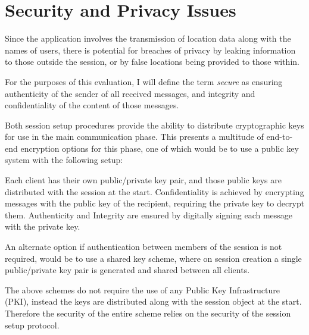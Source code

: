 \section{Security and Privacy Issues}
\label{security}

Since the application involves the transmission of location data along with the names of users, there is potential for breaches of privacy by leaking information to those outside the session, or by false locations being provided to those within.

For the purposes of this evaluation, I will define the term \emph{secure} as ensuring authenticity of the sender of all received messages, and integrity and confidentiality of the content of those messages.

Both session setup procedures provide the ability to distribute cryptographic keys for use in the main communication phase. This presents a multitude of end-to-end encryption options for this phase, one of which would be to use a public key system with the following setup:

Each client has their own public/private key pair, and those public keys are distributed with the session at the start. Confidentiality is achieved by encrypting messages with the public key of the recipient, requiring the private key to decrypt them. Authenticity and Integrity are ensured by digitally signing each message with the private key.

An alternate option if authentication between members of the session is not required, would be to use a shared key scheme, where on session creation a single public/private key pair is generated and shared between all clients.

The above schemes do not require the use of any Public Key Infrastructure (PKI), instead the keys are distributed along with the session object at the start. Therefore the security of the entire scheme relies on the security of the session setup protocol.

